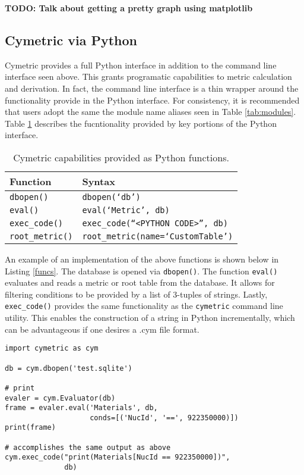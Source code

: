 \documentclass{anstrans}
\newcommand{\TODO}[1] {{\color{red}\textbf{TODO: #1}}}
\newcommand{\code}[1]{{\color{code}\texttt{#1}}}
\begin{document}
\TODO{Talk about getting a pretty graph using matplotlib}

\subsection{Cymetric via Python}
Cymetric provides a full Python interface in addition to the command line 
interface seen above. This grants programatic capabilities to metric 
calculation and derivation. In fact, the command line interface is a thin
wrapper around the functionality provide in the Python interface.
For consistency, it is recommended that users adopt the same the module name 
aliases seen in Table \ref{tab:modules}. 
Table \ref{tab:pyfunc} describes the fucntionality provided by key 
portions of the Python interface.

\begin{table}[htb]
\centering
\caption{Cymetric capabilities provided as Python functions.}
\begin{tabular}{ll}
\toprule
  Function           & Syntax                 \\
\midrule 
  \code{dbopen()}    & \code{dbopen(`db')}         \\
  \code{eval()}      & \code{eval(`Metric', db)}   \\
  \code{exec\_code()} & \code{exec\_code(``<PYTHON CODE>'', db)}  \\ 
  \code{root\_metric()} & \code{root\_metric(name=`CustomTable')}  \\
\bottomrule
\end{tabular}
\label{tab:pyfunc}
\end{table} 

An example of an implementation of the above functions is shown below in 
Listing \ref{funcs}. The database is opened via \code{dbopen()}. The 
function \code{eval()} evaluates and reads a metric or root table from the 
database. It allows for filtering conditions to be provided by a list of 
3-tuples of strings. 
Lastly, \code{exec\_code()} provides the same functionality as the
\code{cymetric} command line utility. This enables the construction of a string in Python incrementally, which can be advantageous if one desires a .cym file format. 

\begin{lstlisting}[caption ={Example Python Script Using Cymetric}, label=funcs]
import cymetric as cym

db = cym.dbopen('test.sqlite')

# print 
evaler = cym.Evaluator(db)
frame = evaler.eval('Materials', db, 
                    conds=[('NucId', '==', 922350000)])
print(frame)

# accomplishes the same output as above
cym.exec_code("print(Materials[NucId == 922350000])", 
              db)
\end{lstlisting}
\end{document}
